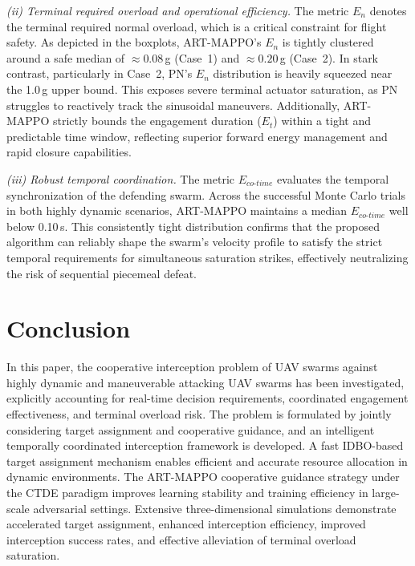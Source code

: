 \documentclass[lettersize,journal]{IEEEtran}
\providecommand{\DIFadd}[1]{{\protect\color{blue}#1}} %
\providecommand{\DIFaddbegin}{} %
\providecommand{\DIFaddend}{} %
\newcommand{\DIFaddincludegraphics}[2][]{{\color{blue}\fbox{\DIFOincludegraphics[#1]{#2}}}} %
\DeclareRobustCommand{\DIFaddbegin}{\DIFOaddbegin \let\includegraphics\DIFaddincludegraphics} %
\DeclareRobustCommand{\DIFaddend}{\DIFOaddend \let\includegraphics\DIFOincludegraphics} %
\begin{document}
\emph{(ii) Terminal required overload and operational efficiency.} The metric $E_n$ denotes the terminal required normal overload, which is a critical constraint for flight safety. As depicted in the boxplots, ART-MAPPO's $E_n$ is tightly clustered around a safe median of $\approx0.08$\,g (Case~1) and $\approx0.20$\,g (Case~2). In stark contrast, particularly in Case~2, PN's $E_n$ distribution is heavily squeezed near the 1.0\,g upper bound. This exposes severe terminal actuator saturation, as PN struggles to reactively track the sinusoidal maneuvers. Additionally, ART-MAPPO strictly bounds the engagement duration ($E_t$) within a tight and predictable time window, reflecting superior forward energy management and rapid closure capabilities.

\emph{(iii) Robust temporal coordination.} The metric $E_{co\text{-}time}$ evaluates the temporal synchronization of the defending swarm. Across the successful Monte Carlo trials in both highly dynamic scenarios, ART-MAPPO maintains a median $E_{co\text{-}time}$ well below 0.10\,s. This consistently tight distribution confirms that the proposed algorithm can reliably shape the swarm's velocity profile to satisfy the strict temporal requirements for simultaneous saturation strikes, effectively neutralizing the risk of sequential piecemeal defeat.



\section{Conclusion}
\label{sec:conclusion}

In this paper, the cooperative interception problem of UAV swarms against highly dynamic and
maneuverable attacking UAV swarms has been investigated, explicitly accounting for real-time
decision requirements, coordinated engagement effectiveness, and terminal overload risk.
The problem is formulated by jointly considering target assignment and cooperative guidance,
and an intelligent temporally coordinated interception framework is developed.
A fast IDBO-based target assignment mechanism enables efficient and accurate resource
allocation in dynamic environments.
The ART-MAPPO cooperative guidance strategy under the CTDE paradigm improves learning
stability and training efficiency in large-scale adversarial settings.
Extensive \DIFaddbegin \DIFadd{three-dimensional }\DIFaddend simulations demonstrate accelerated target assignment, enhanced interception
efficiency, improved interception success rates, and effective alleviation of terminal overload
saturation.
\end{document}
